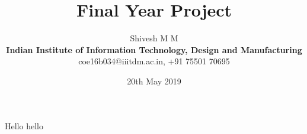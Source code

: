 \documentclass{article}
\title{Final Year Project}
\author{Shivesh M M\\\textbf{Indian Institute of Information Technology, Design and Manufacturing}\\coe16b034@iiitdm.ac.in, +91 75501 70695}
\date{20th May 2019}
\begin{document}
	\maketitle
	Hello
	\clearpage
	hello

	
\end{document}
